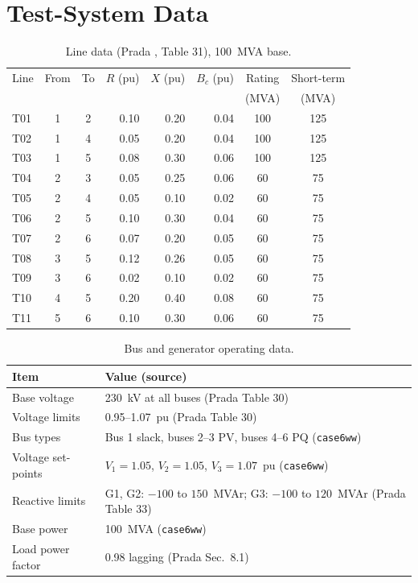 \chapter{Test-System Data}

\begin{table}[H]
\centering
\caption{Line data (Prada \cite{prada2017}, Table 31), 100~MVA base.}
\label{tab:lines}
\begin{tabular}{lccrrrcc}
\toprule
Line & From & To & $R$ (pu) & $X$ (pu) & $B_c$ (pu) & Rating & Short-term\\
 & & & & & & (MVA) & (MVA)\\
\midrule
T01 & 1 & 2 & 0.10 & 0.20 & 0.04 & 100 & 125\\
T02 & 1 & 4 & 0.05 & 0.20 & 0.04 & 100 & 125\\
T03 & 1 & 5 & 0.08 & 0.30 & 0.06 & 100 & 125\\
T04 & 2 & 3 & 0.05 & 0.25 & 0.06 & 60 & 75\\
T05 & 2 & 4 & 0.05 & 0.10 & 0.02 & 60 & 75\\
T06 & 2 & 5 & 0.10 & 0.30 & 0.04 & 60 & 75\\
T07 & 2 & 6 & 0.07 & 0.20 & 0.05 & 60 & 75\\
T08 & 3 & 5 & 0.12 & 0.26 & 0.05 & 60 & 75\\
T09 & 3 & 6 & 0.02 & 0.10 & 0.02 & 60 & 75\\
T10 & 4 & 5 & 0.20 & 0.40 & 0.08 & 60 & 75\\
T11 & 5 & 6 & 0.10 & 0.30 & 0.06 & 60 & 75\\
\bottomrule
\end{tabular}
\end{table}

\begin{table}[H]
\centering
\caption{Bus and generator operating data.}
\begin{tabular}{lp{}}
\toprule
Item & Value (source)\\
\midrule
Base voltage & 230~kV at all buses (Prada Table 30)\\
Voltage limits & 0.95--1.07~pu (Prada Table 30)\\
Bus types & Bus 1 slack, buses 2--3 PV, buses 4--6 PQ (\texttt{case6ww})\\
Voltage set-points & $V_1 = 1.05$, $V_2 = 1.05$, $V_3 = 1.07$~pu (\texttt{case6ww})\\
Reactive limits & G1, G2: $-100$ to $150$~MVAr; G3: $-100$ to $120$~MVAr (Prada Table 33)\\
Base power & 100~MVA (\texttt{case6ww})\\
Load power factor & 0.98 lagging (Prada Sec.~8.1)\\
\bottomrule
\end{tabular}
\end{table}

